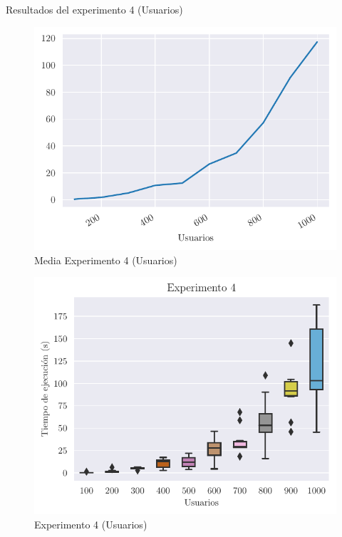 \begin{table}[H]
    \caption{Resultados del experimento 4 (Usuarios)}%
    \label{tab:ex4u}
    \begin{center}
    
    \end{center}
\end{table}

\begin{figure}[H]
    \centering
    \includegraphics{include/plots/ex4_u_mean_time.pdf}
    \caption{Media Experimento 4 (Usuarios)}%
    \label{fig:ex4u_mean}
\end{figure}

\begin{figure}[H]
    \centering
    \includegraphics{include/plots/ex4_u_time_bplot.pdf}
    \caption{Experimento 4 (Usuarios)}%
    \label{fig:ex4u}
\end{figure}

